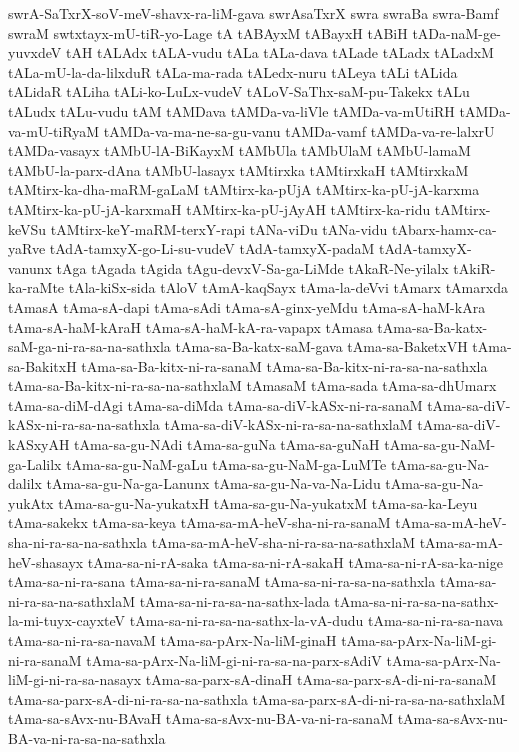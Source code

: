 {swrA-SaTxrX-soV-meV-shavx-ra-liM-gava
swrAsaTxrX
swra
swraBa
swra-Bamf
swraM
swtxtayx-mU-tiR-yo-Lage
tA
tABAyxM
tABayxH
tABiH
tADa-naM-ge-yuvxdeV
tAH
tALAdx
tALA-vudu
tALa
tALa-dava
tALade
tALadx
tALadxM
tALa-mU-la-da-lilxduR
tALa-ma-rada
tALedx-nuru
tALeya
tALi
tALida
tALidaR
tALiha
tALi-ko-LuLx-vudeV
tALoV-SaThx-saM-pu-Takekx
tALu
tALudx
tALu-vudu
tAM
tAMDava
tAMDa-va-liVle
tAMDa-va-mUtiRH
tAMDa-va-mU-tiRyaM
tAMDa-va-ma-ne-sa-gu-vanu
tAMDa-vamf
tAMDa-va-re-lalxrU
tAMDa-vasayx
tAMbU-lA-BiKayxM
tAMbUla
tAMbUlaM
tAMbU-lamaM
tAMbU-la-parx-dAna
tAMbU-lasayx
tAMtirxka
tAMtirxkaH
tAMtirxkaM
tAMtirx-ka-dha-maRM-gaLaM
tAMtirx-ka-pUjA
tAMtirx-ka-pU-jA-karxma
tAMtirx-ka-pU-jA-karxmaH
tAMtirx-ka-pU-jAyAH
tAMtirx-ka-ridu
tAMtirx-keVSu
tAMtirx-keY-maRM-terxY-rapi
tANa-viDu
tANa-vidu
tAbarx-hamx-ca-yaRve
tAdA-tamxyX-go-Li-su-vudeV
tAdA-tamxyX-padaM
tAdA-tamxyX-vanunx
tAga
tAgada
tAgida
tAgu-devxV-Sa-ga-LiMde
tAkaR-Ne-yilalx
tAkiR-ka-raMte
tAla-kiSx-sida
tAloV
tAmA-kaqSayx
tAma-la-deVvi
tAmarx
tAmarxda
tAmasA
tAma-sA-dapi
tAma-sAdi
tAma-sA-ginx-yeMdu
tAma-sA-haM-kAra
tAma-sA-haM-kAraH
tAma-sA-haM-kA-ra-vapapx
tAmasa
tAma-sa-Ba-katx-saM-ga-ni-ra-sa-na-sathxla
tAma-sa-Ba-katx-saM-gava
tAma-sa-BaketxVH
tAma-sa-BakitxH
tAma-sa-Ba-kitx-ni-ra-sanaM
tAma-sa-Ba-kitx-ni-ra-sa-na-sathxla
tAma-sa-Ba-kitx-ni-ra-sa-na-sathxlaM
tAmasaM
tAma-sada
tAma-sa-dhUmarx
tAma-sa-diM-dAgi
tAma-sa-diMda
tAma-sa-diV-kASx-ni-ra-sanaM
tAma-sa-diV-kASx-ni-ra-sa-na-sathxla
tAma-sa-diV-kASx-ni-ra-sa-na-sathxlaM
tAma-sa-diV-kASxyAH
tAma-sa-gu-NAdi
tAma-sa-guNa
tAma-sa-guNaH
tAma-sa-gu-NaM-ga-Lalilx
tAma-sa-gu-NaM-gaLu
tAma-sa-gu-NaM-ga-LuMTe
tAma-sa-gu-Na-dalilx
tAma-sa-gu-Na-ga-Lanunx
tAma-sa-gu-Na-va-Na-Lidu
tAma-sa-gu-Na-yukAtx
tAma-sa-gu-Na-yukatxH
tAma-sa-gu-Na-yukatxM
tAma-sa-ka-Leyu
tAma-sakekx
tAma-sa-keya
tAma-sa-mA-heV-sha-ni-ra-sanaM
tAma-sa-mA-heV-sha-ni-ra-sa-na-sathxla
tAma-sa-mA-heV-sha-ni-ra-sa-na-sathxlaM
tAma-sa-mA-heV-shasayx
tAma-sa-ni-rA-saka
tAma-sa-ni-rA-sakaH
tAma-sa-ni-rA-sa-ka-nige
tAma-sa-ni-ra-sana
tAma-sa-ni-ra-sanaM
tAma-sa-ni-ra-sa-na-sathxla
tAma-sa-ni-ra-sa-na-sathxlaM
tAma-sa-ni-ra-sa-na-sathx-lada
tAma-sa-ni-ra-sa-na-sathx-la-mi-tuyx-cayxteV
tAma-sa-ni-ra-sa-na-sathx-la-vA-dudu
tAma-sa-ni-ra-sa-nava
tAma-sa-ni-ra-sa-navaM
tAma-sa-pArx-Na-liM-ginaH
tAma-sa-pArx-Na-liM-gi-ni-ra-sanaM
tAma-sa-pArx-Na-liM-gi-ni-ra-sa-na-parx-sAdiV
tAma-sa-pArx-Na-liM-gi-ni-ra-sa-nasayx
tAma-sa-parx-sA-dinaH
tAma-sa-parx-sA-di-ni-ra-sanaM
tAma-sa-parx-sA-di-ni-ra-sa-na-sathxla
tAma-sa-parx-sA-di-ni-ra-sa-na-sathxlaM
tAma-sa-sAvx-nu-BAvaH
tAma-sa-sAvx-nu-BA-va-ni-ra-sanaM
tAma-sa-sAvx-nu-BA-va-ni-ra-sa-na-sathxla
}
